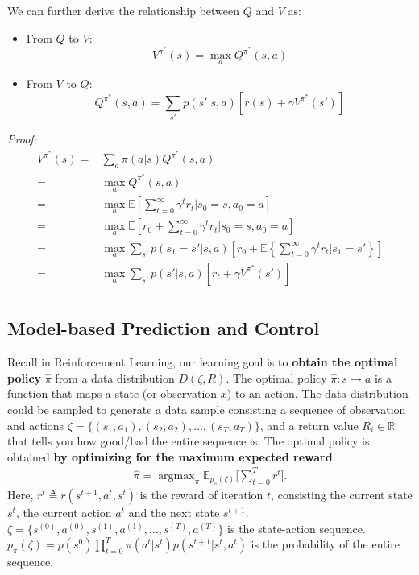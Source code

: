 \documentclass[11pt]{article}
\DeclareMathOperator*{\argmax}{argmax} %
\begin{document}
We can further derive the relationship between $Q$ and $V$ as:
\begin{itemize}
    \item From $Q$ to $V$:
    $$V^{\pi^*}(s) = \max_{a} Q^{\pi^*}(s,a)$$
    \item From $V$ to $Q$:
    $$Q^{\pi^*}(s,a) = \sum_{s'} p(s'|s,a) [r(s)+\gamma V^{\pi^*}(s')]$$
\end{itemize}
\noindent\textit{Proof:}
\begin{equation}
\begin{split}
V^{\pi^*}(s) = & \sum_a \pi (a|s) Q^{\pi^*}(s,a) \nonumber\\  
= & \max_{a} Q^{\pi^*}(s,a)\\
= & \max_{a} \mathbb{E}\left[\sum_{t=0}^{\infty} \gamma^t r_t\bigg|s_0=s,a_0=a\right]\\
= & \max_{a} \mathbb{E}\left[r_0+\sum_{t=0}^{\infty} \gamma^t r_t\bigg|s_0=s, a_0 =a\right]\\
= & \max_{a} \sum_{s'} p(s_1=s'|s,a) \left[r_0+ \mathbb{E} \left\{\sum_{t=0}^{\infty} \gamma^t r_t\bigg|s_1=s' \right\}\right]\\
= & \max_{a} \sum_{s'} p(s'|s,a) [r_t + \gamma V^{\pi^*}(s')]\\
\end{split}
\end{equation}



\subsection{Model-based Prediction and Control}

Recall in Reinforcement Learning, our learning goal is to \textbf{obtain the optimal policy} $\hat{\pi}$ from a data distribution $D(\zeta, R)$. The optimal policy $\hat{\pi}: s \rightarrow a$ is a function that maps a state (or observation $x$) to an action. The data distribution could be sampled to generate a data sample consisting a sequence of observation and actions $\zeta = \{(s_1, a_1), (s_2, a_2), \dots, (s_T, a_T)\}$, and a return value $R_i \in \mathbb{R}$ that tells you how good/bad the entire sequence is. The optimal policy is obtained \textbf{by optimizing for the maximum expected reward}:
%
\begin{align}
\hat{\pi} = \argmax_\pi \mathbb{E}_{p_\pi(\zeta)}\Big[\sum^T_{t=0} r^t \Big].
\end{align}
%
Here, $r^t \triangleq r(s^{t+1}, a^t, s^t)$ is the reward of iteration $t$, consisting the current state $s^t$, the current action $a^t$ and the next state $s^{t+1}$. $\zeta = \{s^{(0)},a^{(0)},s^{(1)},a^{(1)},...,s^{(T)},a^{(T)}\}$ is the state-action sequence. $p_\pi(\zeta) = p(s^0)\prod_{t=0}^T \pi(a^t|s^t)p(s^{t+1}|s^t, a^t)$ is the probability of the entire sequence. 
\end{document}
